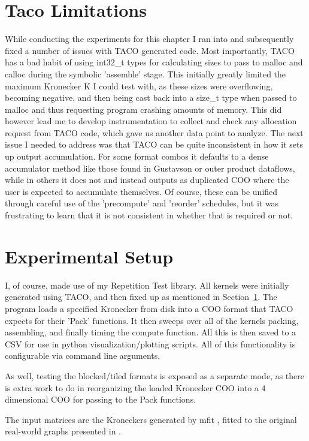 \section{Taco Limitations}
\label{sec:taco-limits}
While conducting the experiments for this chapter I ran into and subsequently fixed a number of issues with TACO generated code. Most importantly, TACO has a
bad habit of using int32\_t types for calculating sizes to pass to malloc and calloc during the symbolic 'assemble' stage. This initially greatly limited the maximum
Kronecker K I could test with, as these sizes were overflowing, becoming negative, and then being cast back into a size\_t
type when passed to malloc and thus requesting program crashing amounts of memory. This did however lead me to develop instrumentation to collect and check
any allocation request from TACO code, which gave us another data point to analyze. The next issue I needed to address was that TACO can be quite inconsistent in
how it sets up output accumulation. For some format combos it defaults to a dense accumulator method
like those found in Gustavson or outer product dataflows, while in others it does not and instead outputs as duplicated COO where
the user is expected to accumulate themselves. Of course, these can be unified through careful use of the 'precompute' and 'reorder' schedules,
but it was frustrating to learn that it is not consistent in whether that is required or not.

\section{Experimental Setup}
I, of course, made use of my Repetition Test library. All kernels were initially generated using TACO, and then fixed up as mentioned in
Section~\ref{sec:taco-limits}. The program loads a specified Kronecker from disk into a COO format that TACO expects for their 'Pack' functions.
It then sweeps over all of the kernels packing, assembling, and finally timing the compute function. All this is then saved to a CSV for
use in python visualization/plotting scripts. All of this functionality is configurable via command line arguments.

As well, testing the blocked/tiled formats is exposed as a separate mode, as there is extra work to do in reorganizing the loaded Kronecker COO into a 4 dimensional
COO for passing to the Pack functions.

The input matrices are the Kroneckers generated by mfit \cite{moez}, fitted to the original real-world graphs presented in \cite{kronecker}.

